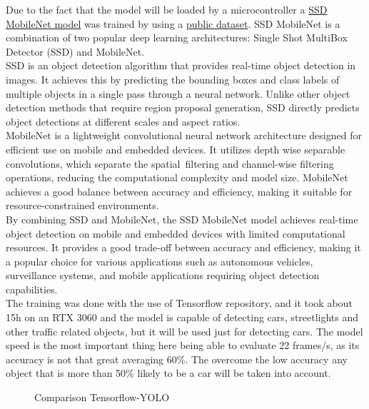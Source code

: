 \documentclass[17pt]{report}
\begin{document}
Due to the fact that the model will be loaded by a microcontroller a
\href{https://github.com/tensorflow/models/blob/master/research/object_detection/g3doc/tf2_detection_zoo.md}{SSD MobileNet model}
was trained by using a \href{https://universe.roboflow.com/pedro-azevedo-3c9ol/bdd100k-3zgda/dataset/5}{public dataset}.
SSD MobileNet is a combination of two popular deep learning architectures:
Single Shot MultiBox Detector (SSD) and MobileNet. \\
\indent
SSD is an object detection algorithm that provides real-time object detection in images.
It achieves this by predicting the bounding boxes and class labels of multiple objects
in a single pass through a neural network. Unlike other object detection methods that
require region proposal generation, SSD directly predicts object detections at different scales
and aspect ratios.\\
\indent
MobileNet is a lightweight convolutional neural network architecture designed for efficient use on
mobile and embedded devices. It utilizes depth wise separable convolutions, which separate the spatial\
filtering and channel-wise filtering operations, reducing the computational complexity and model size.
MobileNet achieves a good balance between accuracy and efficiency, making it suitable for
resource-constrained environments.\\
\indent
By combining SSD and MobileNet, the SSD MobileNet model achieves real-time object detection on mobile
and embedded devices with limited computational resources. It provides a good trade-off between accuracy
and efficiency, making it a popular choice for various applications such as autonomous vehicles,
surveillance systems, and mobile applications requiring object detection capabilities.\\
\indent
The training was done with the use of Tensorflow repository, and it took about 15h
on an RTX 3060 and the model is capable of detecting cars, streetlights and other
traffic related objects, but it will be used just for detecting cars. The model speed
is the most important thing here being able to evaluate 22 frames/s, as its
accuracy is not that great averaging 60\%. The overcome the low accuracy any object 
that is more than 50\% likely to be a car will be taken into account.\\

\begin{figure}[h!]
    \centering
    \label{fig:Comparison Tensorflow-YOLO}
    \caption{Comparison Tensorflow-YOLO}
\end{figure}
\end{document}

